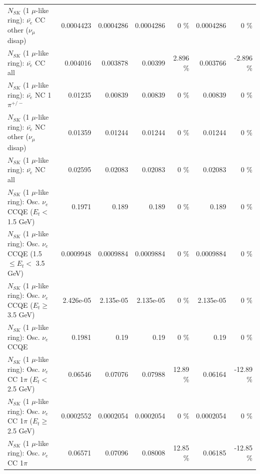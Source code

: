 \begin{table}
\begin{tabular}{| l | r | r | r  r | r  r |}
          $N_{SK}$ (1 $\mu$-like ring): $\bar{\nu_e}$ CC other ($\nu_\mu$ disap) &       0.0004423 &       0.0004286 &       0.0004286 &        0 \%  &       0.0004286 &        0 \%  \\ 
                            $N_{SK}$ (1 $\mu$-like ring): $\bar{\nu_{e}}$ CC all &        0.004016 &        0.003878 &         0.00399 &    2.896 \%  &        0.003766 &   -2.896 \%  \\ 
\hline
                     $N_{SK}$ (1 $\mu$-like ring): $\bar{\nu_e}$ NC 1$\pi^{+/-}$ &         0.01235 &         0.00839 &         0.00839 &        0 \%  &         0.00839 &        0 \%  \\ 
          $N_{SK}$ (1 $\mu$-like ring): $\bar{\nu_e}$ NC other ($\nu_\mu$ disap) &         0.01359 &         0.01244 &         0.01244 &        0 \%  &         0.01244 &        0 \%  \\ 
                            $N_{SK}$ (1 $\mu$-like ring): $\bar{\nu_{e}}$ NC all &         0.02595 &         0.02083 &         0.02083 &        0 \%  &         0.02083 &        0 \%  \\ 
\hline
\hline
\hline
             $N_{SK}$ (1 $\mu$-like ring): Osc. $\nu_e$ CCQE ($E_{t} <$ 1.5 GeV) &          0.1971 &           0.189 &           0.189 &        0 \%  &           0.189 &        0 \%  \\ 
    $N_{SK}$ (1 $\mu$-like ring): Osc. $\nu_e$ CCQE (1.5 $\leq E_{t} <$ 3.5 GeV) &       0.0009948 &       0.0009884 &       0.0009884 &        0 \%  &       0.0009884 &        0 \%  \\ 
          $N_{SK}$ (1 $\mu$-like ring): Osc. $\nu_e$ CCQE ($E_{t} \geq$ 3.5 GeV) &       2.426e-05 &       2.135e-05 &       2.135e-05 &        0 \%  &       2.135e-05 &        0 \%  \\ 
\hline
                                 $N_{SK}$ (1 $\mu$-like ring): Osc. $\nu_e$ CCQE &          0.1981 &            0.19 &            0.19 &        0 \%  &            0.19 &        0 \%  \\ 
\hline
        $N_{SK}$ (1 $\mu$-like ring): Osc. $\nu_e$ CC 1$\pi$ ($E_{t} <$ 2.5 GeV) &         0.06546 &         0.07076 &         0.07988 &    12.89 \%  &         0.06164 &   -12.89 \%  \\ 
     $N_{SK}$ (1 $\mu$-like ring): Osc. $\nu_e$ CC 1$\pi$ ($E_{t} \geq$ 2.5 GeV) &       0.0002552 &       0.0002054 &       0.0002054 &        0 \%  &       0.0002054 &        0 \%  \\ 
\hline
                            $N_{SK}$ (1 $\mu$-like ring): Osc. $\nu_e$ CC 1$\pi$ &         0.06571 &         0.07096 &         0.08008 &    12.85 \%  &         0.06185 &   -12.85 \%  \\ 

\end{tabular}
\end{table}
